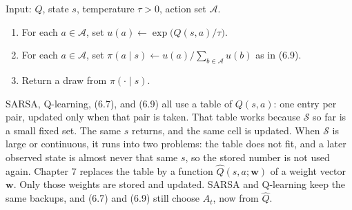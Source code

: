 \begin{implnote}
Input: $Q$, state $s$, temperature $\tau>0$, action set $\mathcal{A}$.

\begin{enumerate}
\item For each $a\in\mathcal{A}$, set $u(a)\leftarrow\exp\bigl(Q(s,a)/\tau\bigr)$.
\item For each $a\in\mathcal{A}$, set $\pi(a\mid s)\leftarrow u(a)/\sum_{b\in\mathcal{A}} u(b)$ as in (6.9).
\item Return a draw from $\pi(\cdot\mid s)$.
\end{enumerate}

\end{implnote}




SARSA, Q-learning, (6.7), and (6.9) all use a table of $Q(s,a)$: one entry per pair, updated only when that pair is taken. That table works because $\mathcal{S}$ so far is a small fixed set. The same $s$ returns, and the same cell is updated. When $\mathcal{S}$ is large or continuous, it runs into two problems: the table does not fit, and a later observed state is almost never that same $s$, so the stored number is not used again. Chapter 7 replaces the table by a function $\hat{Q}(s,a;\mathbf{w})$ of a weight vector $\mathbf{w}$. Only those weights are stored and updated. SARSA and Q-learning keep the same backups, and (6.7) and (6.9) still choose $A_t$, now from $\hat{Q}$.
